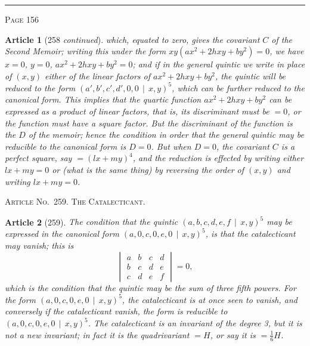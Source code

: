 \documentclass[11pt,a4paper]{article}
\theoremstyle{cayley}
\newtheorem{art}{Article}
\begin{document}
\vspace{1em}
\noindent\rule{\textwidth}{0.4pt}
\begin{center}\textsc{Page 156}\end{center}
\newpage

\begin{art}[258 \textit{continued}]
which, equated to zero, gives the covariant $C$ of the Second Memoir; writing this under the form $xy(ax^2 + 2hxy + by^2) = 0$, we have $x = 0$, $y = 0$, $ax^2 + 2hxy + by^2 = 0$; and if in the general quintic we write in place of $(x, y)$ either of the linear factors of $ax^2 + 2hxy + by^2$, the quintic will be reduced to the form $(a', b', c', d', 0, 0 \,\mid\, x, y)^5$, which can be further reduced to the canonical form. This implies that the quartic function $ax^2 + 2hxy + by^2$ can be expressed as a product of linear factors, that is, its discriminant must be $=0$, or the function must have a square factor. But the discriminant of the function is the $D$ of the memoir; hence the condition in order that the general quintic may be reducible to the canonical form is $D=0$. But when $D=0$, the covariant $C$ is a perfect square, say $= (lx + my)^4$, and the reduction is effected by writing either $lx + my = 0$ or (what is the same thing) by reversing the order of $(x, y)$ and writing $lx + my = 0$.
\end{art}

\begin{center}
\textsc{Article No.\ 259. The Catalecticant.}
\end{center}

\begin{art}[259]
The condition that the quintic $(a, b, c, d, e, f \,\mid\, x, y)^5$ may be expressed in the canonical form $(a, 0, c, 0, e, 0 \,\mid\, x, y)^5$, is that the catalecticant may vanish; this is
\[
\begin{vmatrix}
a & b & c & d \\
b & c & d & e \\
c & d & e & f
\end{vmatrix} = 0,
\]
which is the condition that the quintic may be the sum of three fifth powers. For the form $(a, 0, c, 0, e, 0 \,\mid\, x, y)^5$, the catalecticant is at once seen to vanish, and conversely if the catalecticant vanish, the form is reducible to $(a, 0, c, 0, e, 0 \,\mid\, x, y)^5$. The catalecticant is an invariant of the degree 3, but it is not a new invariant; in fact it is the quadrivariant $= H$, or say it is $= \frac{1}{6}H$.
\end{art}
\end{document}

